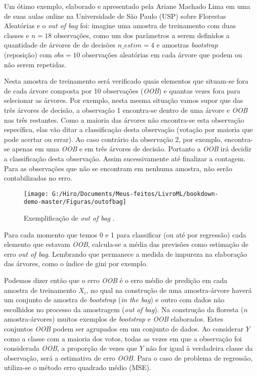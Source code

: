 \documentclass[
  openany]{book}
\begin{document}
Um ótimo exemplo, elaborado e apresentado pela Ariane Machado Lima em uma de suas aulas online na Universidade de São Paulo (USP) sobre Florestas Aleatórias e o \emph{out of bag} foi: imagine uma amostra de treinamento com duas classes e \(n=18\) observações, como um dos parâmetros a serem definidos a quantidade de árvores de de decisões \(n\_estim=4\) e amostras \emph{bootstrap} (reposição) com \(obs=10\) observações aleatórias em cada árvore que podem ou não serem repetidas.

Nesta amostra de treinamento será verificado quais elementos que situam-se fora de cada árvore composta por 10 observações (\emph{OOB}) e quantas vezes fora para selecionar as árvores. Por exemplo, nesta mesma situação vamos supor que das três árvores de decisão, a observação 1 encontra-se dentro de uma árvore e \emph{OOB} nas três restantes. Como a maioria das árvores não encontra-se esta observação específica, elas vão ditar a classificação desta observação (votação por maioria que pode acertar ou errar). Ao caso contrário da observação 2, por exemplo, encontra-se apenas em uma \emph{OOB} e em três árvores de decisão. Portanto a \emph{OOB} irá decidir a classificação desta observação. Assim sucessivamente até finalizar a contagem. Para as observações que não se encontram em nenhuma amostra, não serão contabilizadas no erro.

\begin{figure}

{\centering \texttt{[image: G:/Hiro/Documents/Meus-feitos/LivroML/bookdown-demo-master/Figuras/outofbag]} 

}

\caption{Exemplificação de \emph{out of bag} \citep{machadousprf}.}\label{fig:outofbag}
\end{figure}



Para cada momento que temos 0 e 1 para classificar (ou até por regressão) cada elemento que estavam \emph{OOB}, calcula-se a média das previsões como estimação de erro \emph{out of bag}. Lembrando que permanece a medida de impureza na elaboração das árvores, como o índice de gini por exemplo.

Podemos dizer então que o erro \emph{OOB} é o erro médio de predição em cada amostra de treinamento \(X_i\), no qual na construção de uma amostra-árvore haverá um conjunto de amostra de \emph{bootstrap} (\emph{in the bag}) e outro com dados não escolhidos no processo da amostragem (\emph{out of bag}). Na construção da floresta (\(n\) amostra-árvores) muitos exemplos de \emph{bootstrap} e \emph{OOB} elaborados. Estes conjuntos \emph{OOB} podem ser agrupados em um conjunto de dados. Ao considerar \(Y\) como a classe com a maioria dos votos, todas as vezes em que a observação foi considerada \emph{OOB}, a proporção de vezes que \(Y\) não for igual à verdadeira classe da observação, será a estimativa de erro \emph{OOB}. Para o caso de problema de regressão, utiliza-se o método erro quadrado médio (MSE).
\end{document}
